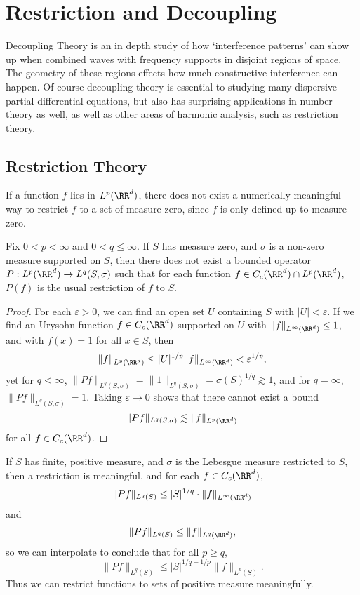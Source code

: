 
\part{Restriction and Decoupling}

Decoupling Theory is an in depth study of how `interference patterns' can show up when combined waves with frequency supports in disjoint regions of space. The geometry of these regions effects how much constructive interference can happen. Of course decoupling theory is essential to studying many dispersive partial differential equations, but also has surprising applications in number theory as well, as well as other areas of harmonic analysis, such as restriction theory.

\chapter{Restriction Theory}

If a function $f$ lies in $L^p(\RR^d)$, there does not exist a numerically meaningful way to restrict $f$ to a set of measure zero, since $f$ is only defined up to measure zero. 

\begin{theorem}
  Fix $0 < p < \infty$ and $0 < q \leq \infty$. If $S$ has measure zero, and $\sigma$ is a non-zero measure supported on $S$, then there does not exist a bounded operator $P: L^p(\RR^d) \to L^q(S,\sigma)$ such that for each function $f \in C_c(\RR^d) \cap L^p(\RR^d)$, $P(f)$ is the usual restriction of $f$ to $S$.
\end{theorem}
\begin{proof}
  For each $\varepsilon > 0$, we can find an open set $U$ containing $S$ with $|U| < \varepsilon$. If we find an Urysohn function $f \in C_c(\RR^d)$ supported on $U$ with $\| f \|_{L^\infty(\RR^d)} \leq 1$, and with $f(x) = 1$ for all $x \in S$, then
  \[ \| f \|_{L^p(\RR^d)} \leq |U|^{1/p} \| f \|_{L^\infty(\RR^d)} < \varepsilon^{1/p}, \]
  yet for $q < \infty$, $\| Pf \|_{L^q(S,\sigma)} = \| 1 \|_{L^q(S,\sigma)} = \sigma(S)^{1/q} \gtrsim 1$, and for $q = \infty$, $\| Pf \|_{L^q(S,\sigma)} = 1$. Taking $\varepsilon \to 0$ shows that there cannot exist a bound
  \[ \| Pf \|_{L^q(S,\sigma)} \lesssim \| f \|_{L^p(\RR^d)} \]
  for all $f \in C_c(\RR^d)$.
\end{proof}

\begin{remark}
  If $S$ has finite, positive measure, and $\sigma$ is the Lebesgue measure restricted to $S$, then a restriction is meaningful, and for each $f \in C_c(\RR^d)$,
  \[ \| Pf \|_{L^q(S)} \leq |S|^{1/q} \cdot \| f \|_{L^\infty(\RR^d)} \]
  and
  \[ \| Pf \|_{L^q(S)} \leq \| f \|_{L^q(\RR^d)}, \]
  so we can interpolate to conclude that for all $p \geq q$,
  \[ \| Pf \|_{L^q(S)} \leq |S|^{1/q - 1/p}  \| f \|_{L^p(S)}. \]
  Thus we can restrict functions to sets of positive measure meaningfully.
\end{remark}

